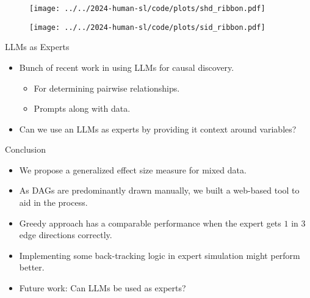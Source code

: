 \documentclass{beamer}
\begin{document}
\begin{frame}
	\begin{figure}
		\centering
		\texttt{[image: ../../2024-human-sl/code/plots/shd\_ribbon.pdf]}
	\end{figure}
\end{frame}

\begin{frame}
	\begin{figure}
		\centering
		\texttt{[image: ../../2024-human-sl/code/plots/sid\_ribbon.pdf]}
	\end{figure}
\end{frame}

\begin{frame}{LLMs as Experts}
	\begin{itemize}
		\item Bunch of recent work in using LLMs for causal discovery.
			\begin{itemize}
				\item For determining pairwise relationships.
				\item Prompts along with data.
			\end{itemize}
		\item Can we use an LLMs as experts by providing it context around variables?
	\end{itemize}
\end{frame}

\begin{frame}{Conclusion}
	\begin{itemize}
		\item We propose a generalized effect size measure for mixed data.
		\item As DAGs are predominantly drawn manually, we built a web-based tool to aid in the process.
		\item Greedy approach has a comparable performance when the expert gets $ 1 $ in $ 3 $ edge directions correctly.
		\item Implementing some back-tracking logic in expert simulation might perform better.
		\item Future work: Can LLMs be used as experts?
	\end{itemize}
\end{frame}
\end{document}
